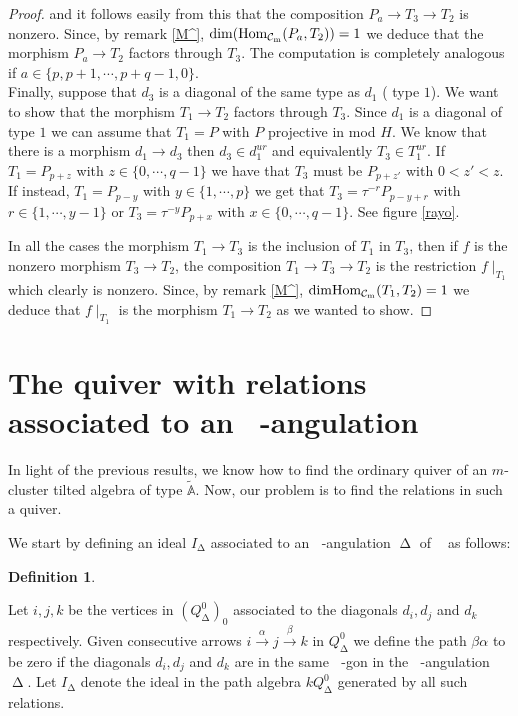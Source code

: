\documentclass{amsart}
\theoremstyle{plain}
\theoremstyle{definition}
\newtheorem{defi}[teo]{Definition}
\begin{document}
\begin{proof}
 and it follows easily from this that the  composition  $P_a\rightarrow T_3 \rightarrow T_2$ is nonzero. Since, by remark \ref{M^}, ${\mathop{\rm dim}\nolimits}({\mathop{\rm Hom_{\mathcal{C}_m}}\nolimits}(P_a,T_2))=1$
we deduce that the  morphism  $P_a\rightarrow T_2$ factors through $T_3$.
The computation is completely analogous if $a\in \{p, p+1, \cdots, p+q-1,
0\}$.\\
Finally,  suppose that   $d_3$ is a  diagonal of the same  type as $d_1$ (
type $1$). We want to show  that the  morphism $T_1 \rightarrow T_2$ factors through $T_3$. Since $d_1$ is a  diagonal of type $1$ we can assume that $T_1=P$ with $P$ projective in   mod $H$. We know that there is a morphism $d_1\rightarrow d_3$ then $d_3\in d_1^{ur}$ and equivalently $T_3\in T_1^{ur}$. If $T_1=P_{p+z}$ with $z\in \{0,\cdots , q-1\}$ we have that $T_3$ must be $P_{p+z'}$ with $ 0<z'<z$. If instead,  $T_1=P_{p-y}$ with $y\in\{1,\cdots, p\}$ we get that $T_3=\tau^{-r}P_{p-y+r}$ with $r\in \{1, \cdots, y-1\}$ or $T_3=\tau^{-y}P_{p+x}$ with $x\in \{0,\cdots, q-1\}$. See figure \ref{rayo}.

In all the cases  the morphism $T_1\rightarrow T_3$ is the inclusion of $T_1 $ in $T_3$, then if $f$ is the nonzero morphism $T_3\rightarrow T_2$, the composition $T_1\rightarrow T_3\rightarrow T_2$ is the restriction $f\mid _{T_1}$ which clearly is nonzero. Since, by  remark \ref{M^}, ${\mathop{\rm dim}\nolimits} {\mathop{\rm Hom_{\mathcal{C}_m}}\nolimits}(T_1,T_2)=1$ we deduce that $f\mid _{T_1}$ is the morphism $T_1\rightarrow T_2$ as we wanted to show.
\end{proof}

\section{The quiver with relations associated to an  ${\mathop{(m+2)}\nolimits}$-angulation}

In light of the previous results, we know how to find the ordinary quiver of an    $m$-cluster tilted algebra of  type $\widetilde{\mathbb{A}}$. Now, our problem is to find  the relations in such a  quiver. \

We start by defining an ideal  $I_{\mathop{\Delta}\nolimits}$ associated to an  ${\mathop{(m+2)}\nolimits}$-angulation ${\mathop{\Delta}\nolimits}$ of ${\mathop{P_{p,q,m}}\nolimits}$ as follows:

 \begin{defi}\label{definicion de I_Delta}

 Let $i, j, k$  be the vertices in   $(Q^0_{\mathop{\Delta}\nolimits})_0$ associated to the diagonals  $d_i, d_j$ and $d_k$ respectively. Given consecutive arrows $i \stackrel{\alpha}{\rightarrow} j \stackrel{\beta}{\rightarrow} k $ in   $Q^0_{\mathop{\Delta}\nolimits}$ we define the path $\beta \alpha$ to be zero if the diagonals   $d_i, d_j$ and  $d_k$ are in the same   ${\mathop{(m+2)}\nolimits}$-gon in the   ${\mathop{(m+2)}\nolimits}$-angulation  ${\mathop{\Delta}\nolimits}$. Let    $I_{\mathop{\Delta}\nolimits}$ denote the ideal in the path algebra  $kQ_{\mathop{\Delta}\nolimits}^0$ generated by all such  relations.

\end{defi}
\end{document}

